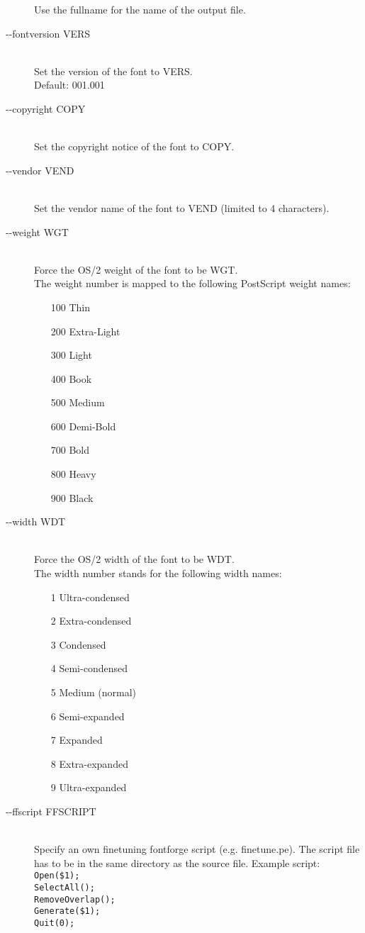 \documentclass{scrartcl}
\begin{document}
\begin{description}
		Use the fullname for the name of the output file.
	\item[-{}-fontversion VERS] \hfill \\
		Set the version of the font to VERS.\\
		Default: 001.001
	\item[-{}-copyright COPY] \hfill \\
		Set the copyright notice of the font to COPY.
	\item[-{}-vendor VEND] \hfill \\
		Set the vendor name of the font to VEND (limited to 4 characters).
	\item[-{}-weight WGT] \hfill \\
		 Force the OS/2 weight of the font to be WGT.\\
		 The weight number is mapped to the following PostScript weight names:
		 \begin{itemize}
		 	\item[100] Thin
		 	\item[200] Extra-Light
		 	\item[300] Light
		 	\item[400] Book
		 	\item[500] Medium 
		 	\item[600] Demi-Bold
		 	\item[700] Bold
		 	\item[800] Heavy
		 	\item[900] Black
		 \end{itemize}
	\item[-{}-width WDT] \hfill \\
		Force the OS/2 width of the font to be WDT.\\
		 The width number stands for the following width names:
		 \begin{itemize}
		 	\item[1] Ultra-condensed
		 	\item[2] Extra-condensed
		 	\item[3] Condensed
		 	\item[4] Semi-condensed
		 	\item[5] Medium (normal)
		 	\item[6] Semi-expanded
		 	\item[7] Expanded
		 	\item[8] Extra-expanded
		 	\item[9] Ultra-expanded
		 \end{itemize}
	\item[ -{}-ffscript FFSCRIPT] \hfill \\
		Specify an own finetuning fontforge script (e.g. finetune.pe). The script file has to be in the same directory as the source file. Example script:\\
		\verb|Open($1);|\\
		\verb|SelectAll();|\\
		\verb|RemoveOverlap();|\\
		\verb|Generate($1);|\\
		\verb|Quit(0);|
\end{description}
%
\end{document}
